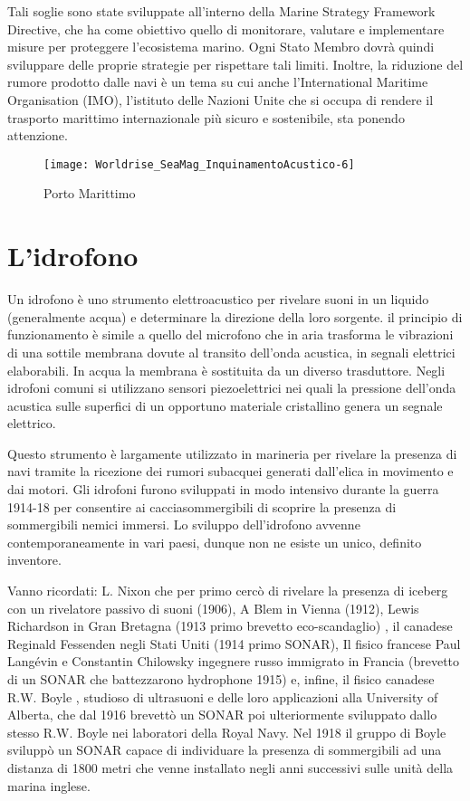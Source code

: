 Tali soglie sono state sviluppate all’interno della Marine Strategy Framework Directive, che ha come obiettivo quello di monitorare, valutare e implementare misure per proteggere l’ecosistema marino. 
Ogni Stato Membro dovrà quindi sviluppare delle proprie strategie per rispettare tali limiti. Inoltre, la riduzione del rumore prodotto dalle navi è un tema su cui anche l’International Maritime Organisation (IMO), l’istituto delle Nazioni Unite che si occupa di rendere il trasporto marittimo internazionale più sicuro e sostenibile, sta ponendo attenzione.
\begin{figure}[h]
\centering
\texttt{[image: Worldrise\_SeaMag\_InquinamentoAcustico-6]}
\caption{Porto Marittimo}
\end{figure}

\section{L'idrofono}

Un idrofono è uno strumento elettroacustico per rivelare suoni in un liquido (generalmente acqua) e determinare la direzione della loro sorgente. il principio di funzionamento è simile a quello del microfono che in aria trasforma le vibrazioni di una sottile membrana dovute al transito dell’onda acustica, in segnali elettrici elaborabili. In acqua la membrana è sostituita da un diverso trasduttore. Negli idrofoni comuni si utilizzano sensori piezoelettrici nei quali la pressione dell’onda acustica sulle superfici di un opportuno materiale cristallino genera un segnale elettrico.

Questo strumento è largamente utilizzato in marineria per rivelare la presenza di navi tramite la ricezione dei rumori subacquei generati dall'elica in movimento e dai motori. Gli idrofoni furono sviluppati in modo intensivo durante la guerra 1914-18 per consentire ai cacciasommergibili di scoprire la presenza di sommergibili nemici immersi. Lo sviluppo dell’idrofono avvenne contemporaneamente in vari paesi, dunque non ne esiste un unico, definito inventore. 

Vanno ricordati: L. Nixon che per primo cercò di rivelare la presenza di iceberg con un rivelatore passivo di suoni (1906), A Blem in Vienna (1912), Lewis Richardson in Gran Bretagna (1913 primo brevetto eco-scandaglio) , il canadese Reginald Fessenden negli Stati Uniti (1914 primo SONAR), Il fisico francese Paul Langévin e Constantin Chilowsky ingegnere russo immigrato in Francia (brevetto di un SONAR che battezzarono hydrophone 1915) e, infine, il fisico canadese R.W. Boyle , studioso di ultrasuoni e delle loro applicazioni alla University of Alberta, che dal 1916 brevettò un SONAR poi ulteriormente sviluppato dallo stesso R.W. Boyle nei laboratori della Royal Navy. Nel 1918 il gruppo di Boyle sviluppò un SONAR capace di individuare la presenza di sommergibili ad una distanza di 1800 metri che venne installato negli anni successivi sulle unità della marina inglese.

